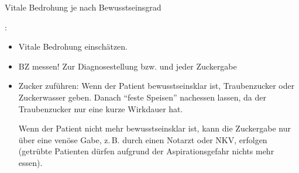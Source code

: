 
\label{m:hypoglykaemie}Vitale
Bedrohung je nach Bewusstseinsgrad

: 
\begin{itemize}
  \item Vitale Bedrohung einschätzen. \TxBeiVit \TxMassVitMK
  
  \item BZ messen! Zur Diagnosestellung bzw.  und 
  jeder Zuckergabe
  \item Zucker zuführen: Wenn der Patient bewusstseinsklar
  ist, Traubenzucker oder Zuckerwasser geben. Danach \enquote{feste
  Speisen} nachessen lassen, da der Traubenzucker nur eine
  kurze Wirkdauer hat.
  
  Wenn der Patient nicht mehr bewusstseinsklar ist, kann die
  Zuckergabe nur über eine venöse Gabe, z.\,B. durch einen
  Notarzt oder NKV, erfolgen (getrübte Patienten dürfen
  aufgrund der Aspirationsgefahr nichts mehr essen).
\end{itemize}

